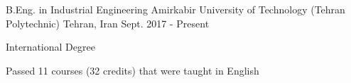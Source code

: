 

\begin{cventries}

  \cventry
    {B.Eng. in Industrial Engineering} %
    {Amirkabir University of Technology (Tehran Polytechnic)} %
    {Tehran, Iran} %
    {Sept. 2017 - Present} %
    {
      \begin{cvitems} %
        \item {International Degree}
        \item {Passed 11 courses (32 credits) that were taught in English}
      \end{cvitems}
    }

\end{cventries}
